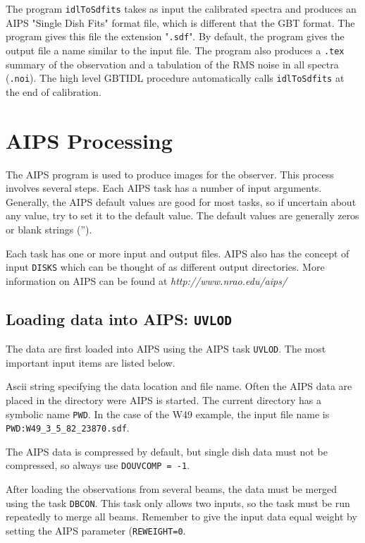 \documentclass[12pt,twoside]{article}
\newcommand{\myitem}[1]{\item{\makebox[1.25in][l]{{\tt #1}}}}
\begin{document}
The program {\tt idlToSdfits} takes as input the calibrated spectra and produces
an AIPS "Single Dish Fits" format file, which is different that the GBT format.
The program gives this file the extension "{\tt .sdf}".   
By default, the program gives the output file a name similar to the input file.
The program also
produces a {\tt .tex} summary of the observation and a tabulation of the
RMS noise in all spectra  ({\tt .noi}).
The high level GBTIDL procedure automatically calls {\tt idlToSdfits} at the end
of calibration.
\section{AIPS Processing}

The AIPS program is used to produce images for the observer.   This process
involves several steps.
Each AIPS task has a number of input arguments.   
Generally, the AIPS default values are good for most tasks, so if uncertain
about any value, try to set it to the default value.  The default values are
generally zeros or blank strings ('').

Each task has one or more input and output files.   AIPS also has the
concept of input {\tt DISKS} which can be thought of as different
output directories.   More information on AIPS can be found at
{\it http://www.nrao.edu/aips/}

\subsection{Loading data into AIPS: {\tt UVLOD}}
The data are first loaded into AIPS using the AIPS task {\tt UVLOD}.   
The most important input items are listed below.
\begin{description}
\myitem{ DATAIN}  Ascii string specifying the data location and file name.
Often the AIPS data are placed in the directory were AIPS is started.  
The current directory has a symbolic name {\tt PWD}.   
In the case of the W49 example, the input file name is 
{\tt PWD:W49\_3\_5\_82\_23870.sdf}.
\myitem{ DOUVCOMP}  The AIPS data is compressed by default, but
single dish data must not be compressed, so always use {\tt DOUVCOMP = -1}.
\end{description}

After loading the observations from several beams, the data must be merged
using the task {\tt DBCON}.
This task only allows two inputs, so the task must be run repeatedly to
merge all beams.   Remember to give the input data equal weight by setting
the AIPS parameter ({\tt REWEIGHT=0}.
\end{document}
